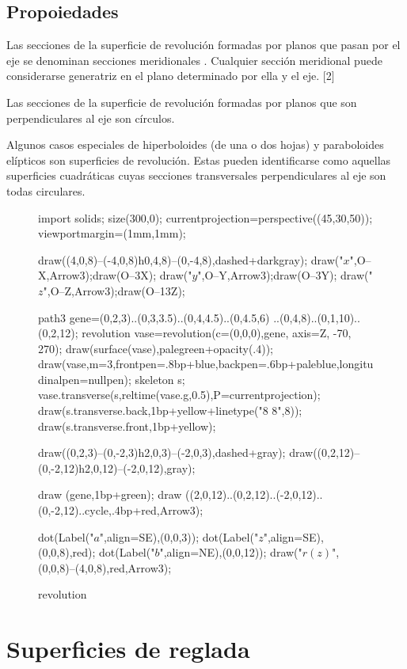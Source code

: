 \subsection{Propoiedades}

Las secciones de la superficie de revolución formadas por planos que pasan por el eje se denominan secciones meridionales . Cualquier sección meridional puede considerarse generatriz en el plano determinado por ella y el eje. [2]

Las secciones de la superficie de revolución formadas por planos que son perpendiculares al eje son círculos.

Algunos casos especiales de hiperboloides (de una o dos hojas) y paraboloides elípticos son superficies de revolución. Estas pueden identificarse como aquellas superficies cuadráticas cuyas secciones transversales perpendiculares al eje son todas circulares.

\begin{figure}[!ht]\centering
	\begin{asy}
	import solids;
	size(300,0);
	currentprojection=perspective((45,30,50));
	viewportmargin=(1mm,1mm);

	draw((4,0,8)--(-4,0,8)^^(0,4,8)--(0,-4,8),dashed+darkgray);
	draw("$x$",O--X,Arrow3);draw(O--3X);
	draw("$y$",O--Y,Arrow3);draw(O--3Y);
	draw("$z$",O--Z,Arrow3);draw(O--13Z);

	path3 gene=(0,2,3)..(0,3,3.5)..(0,4,4.5)..(0,4.5,6)
	..(0,4,8)..(0,1,10)..(0,2,12);
	revolution vase=revolution(c=(0,0,0),gene, axis=Z, -70, 270);
	draw(surface(vase),palegreen+opacity(.4));
	draw(vase,m=3,frontpen=.8bp+blue,backpen=.6bp+paleblue,longitudinalpen=nullpen);
	skeleton s;
	vase.transverse(s,reltime(vase.g,0.5),P=currentprojection);
	draw(s.transverse.back,1bp+yellow+linetype("8 8",8));
	draw(s.transverse.front,1bp+yellow);

	draw((0,2,3)--(0,-2,3)^^(2,0,3)--(-2,0,3),dashed+gray);
	draw((0,2,12)--(0,-2,12)^^(2,0,12)--(-2,0,12),gray);

	draw (gene,1bp+green);
	draw ((2,0,12)..(0,2,12)..(-2,0,12)..(0,-2,12)..cycle,.4bp+red,Arrow3);

	dot(Label("$a$",align=SE),(0,0,3));
	dot(Label("$z$",align=SE),(0,0,8),red);
	dot(Label("$b$",align=NE),(0,0,12));
	draw("$r(z)$",(0,0,8)--(4,0,8),red,Arrow3);

	\end{asy}
	\caption{revolution}\end{figure}
 \section{Superficies de reglada}

